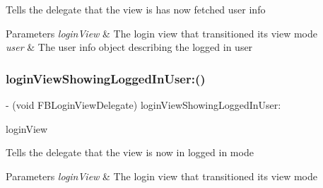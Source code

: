 Tells the delegate that the view is has now fetched user info


\begin{DoxyParams}{Parameters}
{\em login\+View} & The login view that transitioned its view mode\\
\hline
{\em user} & The user info object describing the logged in user \\
\hline
\end{DoxyParams}
\mbox{\label{protocolFBLoginViewDelegate_01-p_a1f8604ad00171b432bdb0e4582856db9}} 
\subsubsection{\texorpdfstring{login\+View\+Showing\+Logged\+In\+User\+:()}{loginViewShowingLoggedInUser:()}\hspace{0.1cm}{\footnotesize\ttfamily [1/5]}}
{\footnotesize\ttfamily -\/ (void F\+B\+Login\+View\+Delegate) login\+View\+Showing\+Logged\+In\+User\+: \begin{DoxyParamCaption}\item[{(\hyperlink{interfaceFBLoginView}{F\+B\+Login\+View} $\ast$)}]{login\+View }\end{DoxyParamCaption}\hspace{0.3cm}{\ttfamily [optional]}}

Tells the delegate that the view is now in logged in mode


\begin{DoxyParams}{Parameters}
{\em login\+View} & The login view that transitioned its view mode \\
\hline
\end{DoxyParams}
\mbox{\label{protocolFBLoginViewDelegate_01-p_a1f8604ad00171b432bdb0e4582856db9}} 
